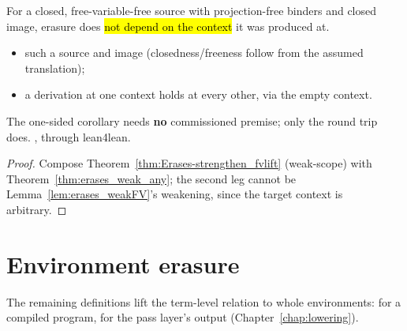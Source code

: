 \begin{theorem}
\label{thm:erases_uniform_closed}
\leanok
{}
 For a closed, free-variable-free source with projection-free binders and closed image, erasure does \hl{not depend on the context} it was produced at.
\begin{itemize}
\item {} such a source and image (closedness/freeness follow from the assumed translation);
\item {} a derivation at one context holds at every other, via the empty context.
\end{itemize}
 The one-sided corollary needs \textbf{no} commissioned premise; only the round trip does.
 \stProved{}, \stInherited{} through lean4lean.
\end{theorem}
\begin{proof}
\leanok
{}
 Compose Theorem~\ref{thm:Erases-strengthen_fvlift} (weak-scope) with Theorem~\ref{thm:erases_weak_any}; the second leg cannot be Lemma~\ref{lem:erases_weakFV}'s weakening, since the target context is arbitrary.
\end{proof}

\section{Environment erasure}
\label{sec:erases:env}

The remaining definitions lift the term-level relation to whole environments: \ErasesEnv{}
for a compiled program, \LowerEnv{} for the pass layer's output (Chapter~\ref{chap:lowering}).

